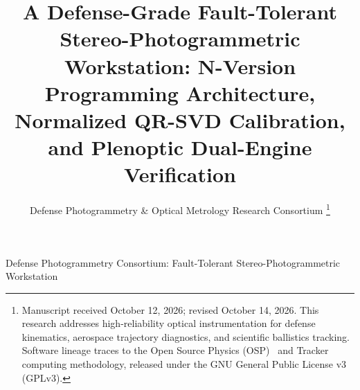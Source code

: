 \documentclass[journal]{IEEEtran}
\begin{document}
\title{A Defense-Grade Fault-Tolerant Stereo-Photogrammetric Workstation: N-Version Programming Architecture, Normalized QR-SVD Calibration, and Plenoptic Dual-Engine Verification}

\author{Defense Photogrammetry \& Optical Metrology Research Consortium
\thanks{Manuscript received October 12, 2026; revised October 14, 2026. This research addresses high-reliability optical instrumentation for defense kinematics, aerospace trajectory diagnostics, and scientific ballistics tracking. Software lineage traces to the Open Source Physics (OSP)~\cite{christian2006physlet} and Tracker~\cite{brown2009tracker} computing methodology, released under the GNU General Public License v3 (GPLv3).}}

%
{Defense Photogrammetry Consortium: Fault-Tolerant Stereo-Photogrammetric Workstation}

\maketitle
\end{document}
